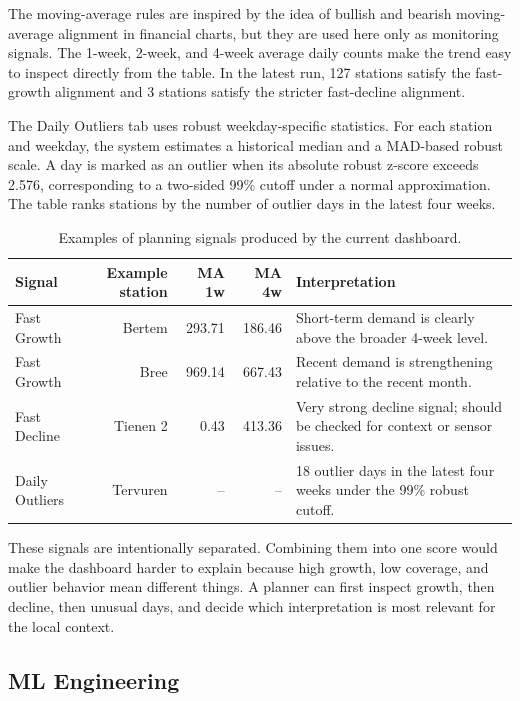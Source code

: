 \documentclass[11pt]{article}
\begin{document}
The moving-average rules are inspired by the idea of bullish and bearish moving-average alignment in financial charts, but they are used here only as monitoring signals. The 1-week, 2-week, and 4-week average daily counts make the trend easy to inspect directly from the table. In the latest run, 127 stations satisfy the fast-growth alignment and 3 stations satisfy the stricter fast-decline alignment.

The Daily Outliers tab uses robust weekday-specific statistics. For each station and weekday, the system estimates a historical median and a MAD-based robust scale. A day is marked as an outlier when its absolute robust z-score exceeds 2.576, corresponding to a two-sided 99\% cutoff under a normal approximation. The table ranks stations by the number of outlier days in the latest four weeks.

\begin{table}[htbp]
\centering
\caption{Examples of planning signals produced by the current dashboard.}
\scriptsize
\begin{tabularx}{0.98\textwidth}{lrrrX}
\toprule
\textbf{Signal} & \textbf{Example station} & \textbf{MA 1w} & \textbf{MA 4w} & \textbf{Interpretation} \\
\midrule
Fast Growth & Bertem & 293.71 & 186.46 & Short-term demand is clearly above the broader 4-week level. \\
Fast Growth & Bree & 969.14 & 667.43 & Recent demand is strengthening relative to the recent month. \\
Fast Decline & Tienen 2 & 0.43 & 413.36 & Very strong decline signal; should be checked for context or sensor issues. \\
Daily Outliers & Tervuren & -- & -- & 18 outlier days in the latest four weeks under the 99\% robust cutoff. \\
\bottomrule
\end{tabularx}
\end{table}

These signals are intentionally separated. Combining them into one score would make the dashboard harder to explain because high growth, low coverage, and outlier behavior mean different things. A planner can first inspect growth, then decline, then unusual days, and decide which interpretation is most relevant for the local context.

\subsection{ML Engineering}
\end{document}
